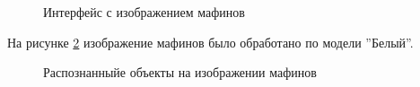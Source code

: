 \begin{figure}[H]
\caption{Интерфейс с изображением мафинов}
\label{systemtest_responce23:image}
\end{figure}

На рисунке \ref{systemtest_responce24:image} изображение мафинов было обработано по модели ''Белый''.

\begin{figure}[H]
\caption{Распознанныйе объекты на изображении мафинов}
\label{systemtest_responce24:image}
\end{figure}